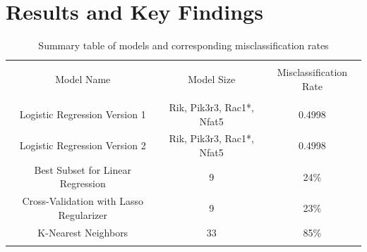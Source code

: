 \documentclass{article}
\begin{document}
\section{Results and Key Findings}
\begin{table}[!htbp] \centering 
	\caption{Summary table of models and corresponding misclassification rates} 
	\label{table:results} 
	\begin{tabular}{ccc} 
		\\[-1.8ex]\hline 
		\hline \\[-1.8ex] 
		Model Name & Model Size & Misclassification Rate \\ 
		\hline \\[-1.8ex] 
		Logistic Regression Version 1 & Rik, Pik3r3, Rac1*, Nfat5 & 0.4998 \\ 
		Logistic Regression Version 2 & Rik, Pik3r3, Rac1*, Nfat5 & 0.4998 \\ 
		Best Subset for Linear Regression& 9 & 24\% \\
		Cross-Validation with Lasso Regularizer & 9 & 23\% \\
		K-Nearest Neighbors & 33 & 85\% \\  
		\hline \\[-1.8ex] 
	\end{tabular} 
\end{table} 
\end{document}
